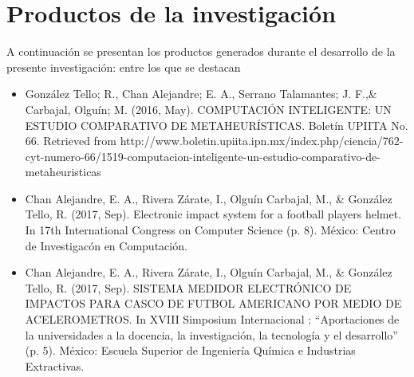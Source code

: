 \section{Productos de la investigaci\'{o}n}
A continuaci\'{o}n  se presentan los productos generados durante el
 desarrollo de la presente investigaci\'{o}n: entre los que se destacan
\begin{itemize}

\item {Gonz\'alez Tello; R., Chan Alejandre; E. A., Serrano Talamantes; J. 
 F.,\& Carbajal, Olgu\'in; M. (2016, May). COMPUTACI\'ON INTELIGENTE: UN 
 ESTUDIO COMPARATIVO DE METAHEUR\'ISTICAS. Bolet\'in UPIITA No. 66. Retrieved 
 from http://www.boletin.upiita.ipn.mx/index.php/ciencia/762-cyt-numero-66/1519-computacion-inteligente-un-estudio-comparativo-de-metaheuristicas}

\item {Chan Alejandre, E. A., Rivera Z\'arate, I., Olgu\'in Carbajal, M., \&
 Gonz\'alez Tello, R. (2017, Sep). Electronic impact system for a football 
 player\textsc{}s helmet. In 17th International Congress on Computer 
 Science (p. 8). M\'exico: Centro de Investigac\'on en Computaci\'on.}

\newpage
\item {Chan Alejandre, E. A., Rivera Z\'arate, I., Olgu\'in Carbajal, M., \& 
 Gonz\'alez Tello, R. (2017, Sep). SISTEMA MEDIDOR ELECTR\'ONICO DE IMPACTOS 
 PARA CASCO DE FUTBOL AMERICANO POR MEDIO DE ACELEROMETROS. In XVIII 
 Simposium Internacional : ``Aportaciones de la universidades a la docencia, 
 la investigaci\'on, la tecnolog\'ia y el desarrollo'' (p. 5). M\'exico: 
 Escuela Superior de Ingenier\'ia Qu\'imica e Industrias Extractivas.}
 
\end{itemize}

